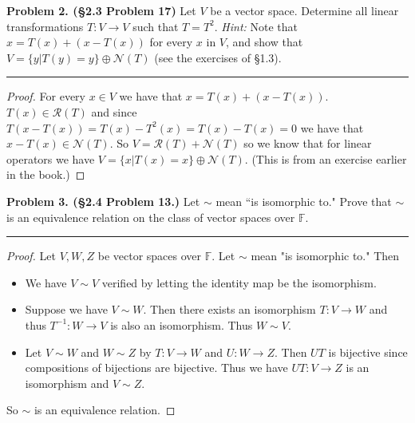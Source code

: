 \documentclass[leqno]{article}
\theoremstyle{nonumberplain}
\newtheorem{proof}{Proof}
\begin{document}
\pagebreak



\noindent\textbf{Problem 2. (\S 2.3 Problem 17)} Let $V$ be a vector space. Determine all linear transformations $T\colon V \to V$ such that $T=T^2$. \emph{Hint:} Note that $x=T(x)+(x-T(x))$ for every $x$ in $V$, and show that $V=\{y \vert T(y)=y\}\oplus \mathcal{N}(T)$ (see the exercises of \S 1.3).

\noindent\rule[0.5ex]{\linewidth}{1pt}

\begin{proof}
For every $x\in V$ we have that $x=T(x)+(x-T(x))$.  $T(x)\in \mathcal{R}(T)$ and since $T(x-T(x))=T(x)-T^2(x)=T(x)-T(x)=0$ we have that $x-T(x)\in \mathcal{N}(T)$.  So $V=\mathcal{R}(T)+\mathcal{N}(T)$ so we know that for linear operators we have $V=\{x\vert T(x)=x\}\oplus \mathcal{N}(T)$. (This is from an exercise earlier in the book.)  
\end{proof}

\pagebreak




\noindent\textbf{Problem 3. (\S 2.4 Problem 13.)} Let $\sim$ mean ``is isomorphic to." Prove that $\sim$ is an equivalence relation on the class of vector spaces over $\mathbb{F}$.

\noindent\rule[0.5ex]{\linewidth}{1pt}

\begin{proof}
Let $V,W,Z$ be vector spaces over $\mathbb{F}$. Let $\sim$ mean "is isomorphic to." Then
\begin{itemize}
\item We have $V\sim V$ verified by letting the identity map be the isomorphism.
\item Suppose we have $V\sim W$. Then there exists an isomorphism $T\colon V \to W$ and thus $T^{-1}\colon W\to V$ is also an isomorphism.  Thus $W \sim V$.
\item Let $V\sim W$ and $W\sim Z$ by $T\colon V\to W$ and $U\colon W\to Z$.  Then $UT$ is bijective since compositions of bijections are bijective.  Thus we have $UT\colon V\to Z$ is an isomorphism and $V\sim Z$.
\end{itemize}
So $\sim$ is an equivalence relation.
\end{proof}
\end{document}
